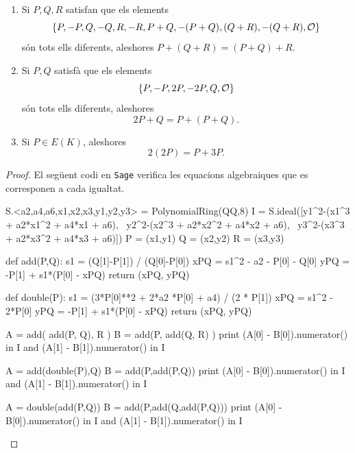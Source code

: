 \begin{proposition}
\begin{enumerate}
    \item Si $P,Q,R$ satisfan que els elements
    \[
    \{P,-P,Q,-Q,R,-R,P+Q,-(P+Q),(Q+R),-(Q+R),\mathcal{O}\}
    \]
    són tots ells diferents, aleshores
    $P+(Q+R)=(P+Q)+R$.
    \item Si $P,Q$ satisfà que els elements
    \[
    \{ P, -P, 2P, -2P, Q, \mathcal{O}\}
    \]
    són tots ells diferents, aleshores
    \[
    2P+Q = P+(P+Q).
    \]
    \item Si $P\in E(K)$, aleshores
    \[
    2(2P) = P + 3P.
    \]
\end{enumerate}
\end{proposition}
\begin{proof}
 El següent codi en \texttt{Sage} verifica les equacions algebraiques que es corresponen a cada igualtat.

\begin{python}
S.<a2,a4,a6,x1,x2,x3,y1,y2,y3> = PolynomialRing(QQ,8)
I = S.ideal([y1^2-(x1^3 + a2*x1^2 + a4*x1 + a6), \ 
             y2^2-(x2^3 + a2*x2^2 + a4*x2 + a6), \ 
             y3^2-(x3^3 + a2*x3^2 + a4*x3 + a6)])
P = (x1,y1)
Q = (x2,y2)
R = (x3,y3)

def add(P,Q):
    s1 = (Q[1]-P[1]) / (Q[0]-P[0])
    xPQ = s1^2 - a2 - P[0] - Q[0]
    yPQ = -P[1] + s1*(P[0] - xPQ)
    return (xPQ, yPQ)
    
def double(P):
    s1 = (3*P[0]**2 + 2*a2 *P[0] + a4) / (2 * P[1])
    xPQ = s1^2 - 2*P[0]
    yPQ = -P[1] + s1*(P[0] - xPQ)
    return (xPQ, yPQ)

A = add( add(P, Q), R )
B = add(P, add(Q, R) )
print (A[0] - B[0]).numerator() in I and (A[1] - B[1]).numerator() in I

A = add(double(P),Q)
B = add(P,add(P,Q))
print (A[0] - B[0]).numerator() in I and (A[1] - B[1]).numerator() in I

A = double(add(P,Q))
B = add(P,add(Q,add(P,Q)))
print (A[0] - B[0]).numerator() in I and (A[1] - B[1]).numerator() in I
\end{python}
\end{proof}

